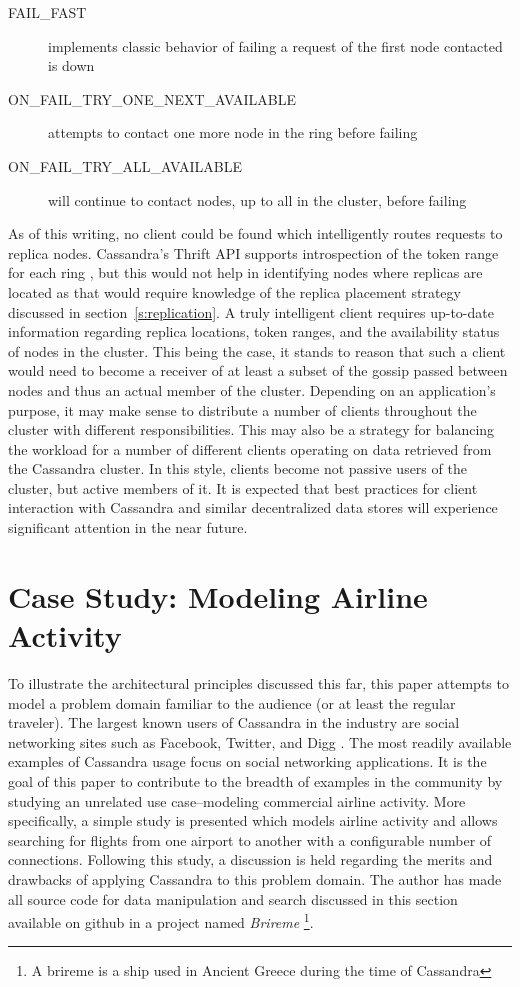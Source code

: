 \documentclass[twocolumn]{article}
\begin{document}
\begin{description}
  \item[FAIL\_FAST] implements classic behavior of failing a request of the first node contacted is down
  \item[ON\_FAIL\_TRY\_ONE\_NEXT\_AVAILABLE] attempts to contact one more node in the ring before failing
  \item[ON\_FAIL\_TRY\_ALL\_AVAILABLE] will continue to contact nodes, up to all in the cluster, before failing
\end{description}

As of this writing, no client could be found which intelligently routes requests to replica nodes.  Cassandra's Thrift API supports introspection of the token range for each ring \cite{ref:source}, but this would not help in identifying nodes where replicas are located as that would require knowledge of the replica placement strategy discussed in section~\ref{s:replication}.  A truly intelligent client requires up-to-date information regarding replica locations, token ranges, and the availability status of nodes in the cluster.  This being the case, it stands to reason that such a client would need to become a receiver of at least a subset of the gossip passed between nodes and thus an actual member of the cluster.  Depending on an application's purpose, it may make sense to distribute a number of clients throughout the cluster with different responsibilities.  This may also be a strategy for balancing the workload for a number of different clients operating on data retrieved from the Cassandra cluster.  In this style, clients become not passive users of the cluster, but active members of it.  It is expected that best practices for client interaction with Cassandra and similar decentralized data stores will experience significant attention in the near future.

\section{Case Study: Modeling Airline Activity}\label{s:study}

To illustrate the architectural principles discussed this far, this paper attempts to model a problem domain familiar to the audience (or at least the regular traveler).  The largest known users of Cassandra in the industry are social networking sites such as Facebook, Twitter, and Digg \cite{ref:cwiki,ref:diggfuture}.  The most readily available examples of Cassandra usage focus on social networking applications. It is the goal of this paper to contribute to the breadth of examples in the community by studying an unrelated use case--modeling commercial airline activity.  More specifically, a simple study is presented which models airline activity and allows searching for flights from one airport to another with a configurable number of connections.  Following this study, a discussion is held regarding the merits and drawbacks of applying Cassandra to this problem domain. The author has made all source code for data manipulation and search discussed in this section available on github \cite{ref:dfsource} in a project named \emph{Brireme} \footnote[1]{A brireme is a ship used in Ancient Greece during the time of Cassandra}.
\end{document}
